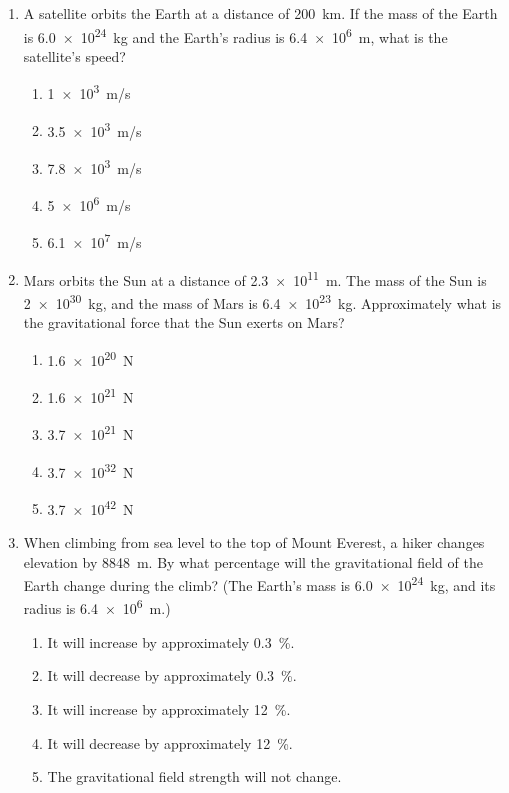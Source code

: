 \documentclass{../../oss-apphys}
\begin{document}
\begin{multicols}{2}
\begin{enumerate}[leftmargin=18pt]
  \item A satellite orbits the Earth at a distance of \SI{200}{\km}. If the mass
    of the Earth is \SI{6.0e24}{\kg} and the Earth's radius is \SI{6.4e6}{\m},
    what is the satellite's speed?
    \begin{enumerate}[noitemsep,topsep=0pt,leftmargin=18pt]
    \item\SI{1e3}{m/s}
    \item\SI{3.5e3}{m/s}
    \item\SI{7.8e3}{m/s}
    \item\SI{5e6}{m/s}
    \item\SI{6.1e7}{m/s}
    \end{enumerate}
  
  \item Mars orbits the Sun at a distance of \SI{2.3e11}{m}. The mass of the Sun
    is \SI{2e30}{kg}, and the mass of Mars is \SI{6.4e23}{kg}. Approximately
    what is the gravitational force that the Sun exerts on Mars?
    \begin{enumerate}[noitemsep,topsep=0pt,leftmargin=18pt]
    \item\SI{1.6e20}{N}
    \item\SI{1.6e21}{N}
    \item\SI{3.7e21}{N}
    \item\SI{3.7e32}{N}
    \item\SI{3.7e42}{N}
    \end{enumerate}

  \item When climbing from sea level to the top of Mount Everest, a hiker
    changes elevation by \SI{8848}{m}. By what percentage will the
    gravitational field of the Earth change during the climb? (The Earth's
    mass is \SI{6.0e24}{\kg}, and its radius is \SI{6.4e6}{\m}.)
    \begin{enumerate}[noitemsep,topsep=0pt,leftmargin=18pt]
    \item It will increase by approximately \SI{0.3}{\percent}.
    \item It will decrease by approximately \SI{0.3}{\percent}.
    \item It will increase by approximately \SI{12}{\percent}.
    \item It will decrease by approximately \SI{12}{\percent}.
    \item The gravitational field strength will not change.
    \end{enumerate}


\end{enumerate}
\end{multicols}
\end{document}

